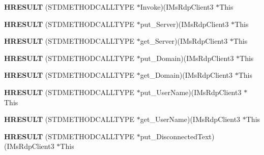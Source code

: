 \begin{DoxyCompactItemize}
\item 
\mbox{\label{struct_i_ms_rdp_client3_vtbl_ad59ba2fadc8b39316c42889ba2337bb5}} 
{\bfseries H\+R\+E\+S\+U\+LT} (S\+T\+D\+M\+E\+T\+H\+O\+D\+C\+A\+L\+L\+T\+Y\+PE $\ast$Invoke)(I\+Ms\+Rdp\+Client3 $\ast$This
\item 
\mbox{\label{struct_i_ms_rdp_client3_vtbl_ab236f6773847adf8b67a2084cae71517}} 
{\bfseries H\+R\+E\+S\+U\+LT} (S\+T\+D\+M\+E\+T\+H\+O\+D\+C\+A\+L\+L\+T\+Y\+PE $\ast$put\+\_\+\+Server)(I\+Ms\+Rdp\+Client3 $\ast$This
\item 
\mbox{\label{struct_i_ms_rdp_client3_vtbl_a14d8eb6f891f3d3a453b8b2917b784ea}} 
{\bfseries H\+R\+E\+S\+U\+LT} (S\+T\+D\+M\+E\+T\+H\+O\+D\+C\+A\+L\+L\+T\+Y\+PE $\ast$get\+\_\+\+Server)(I\+Ms\+Rdp\+Client3 $\ast$This
\item 
\mbox{\label{struct_i_ms_rdp_client3_vtbl_a68a39d64ef2feeaec64359d9040c2900}} 
{\bfseries H\+R\+E\+S\+U\+LT} (S\+T\+D\+M\+E\+T\+H\+O\+D\+C\+A\+L\+L\+T\+Y\+PE $\ast$put\+\_\+\+Domain)(I\+Ms\+Rdp\+Client3 $\ast$This
\item 
\mbox{\label{struct_i_ms_rdp_client3_vtbl_a162188cb6b63060d59e2b48a63724153}} 
{\bfseries H\+R\+E\+S\+U\+LT} (S\+T\+D\+M\+E\+T\+H\+O\+D\+C\+A\+L\+L\+T\+Y\+PE $\ast$get\+\_\+\+Domain)(I\+Ms\+Rdp\+Client3 $\ast$This
\item 
\mbox{\label{struct_i_ms_rdp_client3_vtbl_ab4713d0f3b46d244f2354f8584dbf3dd}} 
{\bfseries H\+R\+E\+S\+U\+LT} (S\+T\+D\+M\+E\+T\+H\+O\+D\+C\+A\+L\+L\+T\+Y\+PE $\ast$put\+\_\+\+User\+Name)(I\+Ms\+Rdp\+Client3 $\ast$This
\item 
\mbox{\label{struct_i_ms_rdp_client3_vtbl_ac5b6d54c7b028ca96e798463299c6094}} 
{\bfseries H\+R\+E\+S\+U\+LT} (S\+T\+D\+M\+E\+T\+H\+O\+D\+C\+A\+L\+L\+T\+Y\+PE $\ast$get\+\_\+\+User\+Name)(I\+Ms\+Rdp\+Client3 $\ast$This
\item 
\mbox{\label{struct_i_ms_rdp_client3_vtbl_a2da64a1d57ca9485877e135c66893b18}} 
{\bfseries H\+R\+E\+S\+U\+LT} (S\+T\+D\+M\+E\+T\+H\+O\+D\+C\+A\+L\+L\+T\+Y\+PE $\ast$put\+\_\+\+Disconnected\+Text)(I\+Ms\+Rdp\+Client3 $\ast$This

\end{DoxyCompactItemize}
